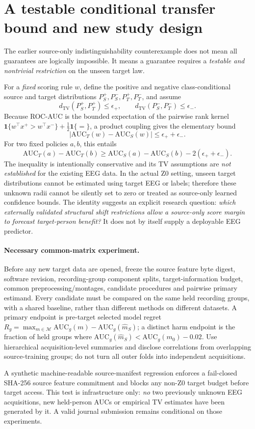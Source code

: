 \section{A testable conditional transfer bound and new study design}
\label{sec:p3-conditional-transfer}
The earlier source-only indistinguishability counterexample
does not mean all guarantees are logically impossible.
It means a guarantee requires a \emph{testable and
nontrivial restriction} on the unseen target law.

For a \emph{fixed} scoring rule $w$, define the positive
and negative class-conditional source and target
distributions $P^+_S,P^-_S,P^+_T,P^-_T$, and assume
\[
 d_{\mathrm{TV}}(P^+_S,P^+_T)\le\epsilon_+,
 \qquad d_{\mathrm{TV}}(P^-_S,P^-_T)\le\epsilon_- .
\]
Because ROC-AUC is the bounded expectation of the
pairwise rank kernel
$\mathbf{1}\{w^\top x^+>w^\top x^-\}
+\tfrac12\mathbf{1}\{=\}$,
a product coupling gives the elementary bound
\[
 |\mathrm{AUC}_T(w)-\mathrm{AUC}_S(w)|
 \le \epsilon_++\epsilon_-.
\]
For two fixed policies $a,b$, this entails
\[
 \mathrm{AUC}_T(a)-\mathrm{AUC}_T(b)
 \ge \mathrm{AUC}_S(a)-\mathrm{AUC}_S(b)
      -2(\epsilon_++\epsilon_-).
\]
The inequality is intentionally conservative and
its TV assumptions are \emph{not established} for
the existing EEG data. In the actual Z0 setting,
unseen target distributions cannot be estimated
using target EEG or labels; therefore these
unknown radii cannot be silently set to zero
or treated as source-only learned confidence bounds.
The identity suggests an explicit research question:
\emph{which externally validated structural shift
restrictions allow a source-only score margin to
forecast target-person benefit?} It does not
by itself supply a deployable EEG predictor.

\paragraph{Necessary common-matrix experiment.}
Before any new target data are opened, freeze the
source feature byte digest, software revision,
recording-group component splits, target-information
budget, common preprocessing/montages, candidate
procedures and pairwise primary estimand. Every
candidate must be compared on the same held
recording groups, with a shared baseline, rather
than different methods on different datasets.
A primary endpoint is pre-target selected
model regret
$R_g=\max_{m\in\mathcal M}\mathrm{AUC}_g(m)
-\mathrm{AUC}_g(\widehat m_S)$;
a distinct harm endpoint is the fraction of
held groups where
$\mathrm{AUC}_g(\widehat m_S)
<\mathrm{AUC}_g(m_0)-0.02$.
Use hierarchical acquisition-level summaries
and disclose correlations from overlapping
source-training groups; do not turn all
outer folds into independent acquisitions.

A synthetic machine-readable source-manifest
regression enforces a fail-closed
SHA-256 source feature commitment and blocks
any non-Z0 target budget before target access.
This test is infrastructure only: \emph{no}
two previously unknown EEG acquisitions, new
held-person AUCs or empirical TV estimates
have been generated by it. A valid journal
submission remains conditional on those experiments.
